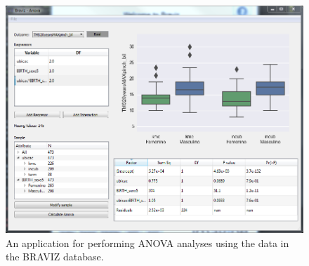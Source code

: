 \documentclass[twocolumn]{svjour3}
\begin{document}
\begin{figure}
\begin{center}
\includegraphics[width=\linewidth]{figures/anova.PNG}
\end{center}
 \caption{\label{fig_anova}An application for performing ANOVA analyses using the data in the BRAVIZ database.}
\end{figure}
\end{document}

